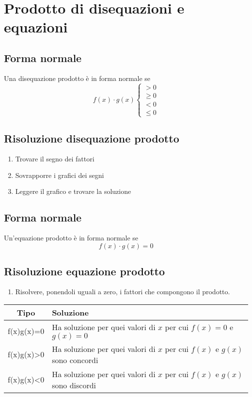 \chapter{Prodotto di disequazioni e equazioni}
\section{Forma normale}
Una disequazione prodotto è in forma normale se
\begin{equation*}
f(x)\cdot g(x)\begin{cases}
>0\\
\geq 0\\
<0\\
\leq 0
\end{cases}
\end{equation*}
\section{Risoluzione disequazione prodotto}
\begin{enumerate}
	\item Trovare il segno dei fattori
	\item Sovrapporre i grafici dei segni
	\item Leggere il grafico e trovare la soluzione
\end{enumerate}
\section{Forma normale}
Un'equazione prodotto è in forma normale se
\begin{equation*}
f(x)\cdot g(x)=0
\end{equation*}
\section{Risoluzione equazione prodotto}
\begin{enumerate}
	\item Risolvere, ponendoli uguali a zero, i fattori che compongono il prodotto.
\end{enumerate}
{\centering{}
	\begin{tabular}{Cp{0.4\textwidth}}
		\toprule
		Tipo& Soluzione \\ 
		\midrule
		f(x)\cdot g(x)=0	& Ha soluzione per quei valori di $x$ per cui $f(x)=0$ e $g(x)= 0$  \\ 
		f(x)\cdot g(x)>0	& Ha soluzione per quei valori di $x$ per cui $f(x)$ e $g(x)$ sono concordi\\ 
	f(x)\cdot g(x)<0& Ha soluzione per quei valori di $x$ per cui $f(x)$ e $g(x)$ sono discordi\\ 
		\bottomrule
	\end{tabular}\par}
